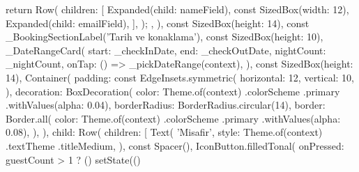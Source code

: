 \documentclass[11pt,a4paper]{article}
\begin{document}
\begin{codeblock}
{{{{{                                  return Row(
                                    children: [
                                      Expanded(child: nameField),
                                      const SizedBox(width: 12),
                                      Expanded(child: emailField),
                                    ],
                                  );
                                },
                              ),
                              const SizedBox(height: 14),
                              const _BookingSectionLabel('Tarih ve konaklama'),
                              const SizedBox(height: 10),
                              _DateRangeCard(
                                start: _checkInDate,
                                end: _checkOutDate,
                                nightCount: _nightCount,
                                onTap: () => _pickDateRange(context),
                              ),
                              const SizedBox(height: 14),
                              Container(
                                padding: const EdgeInsets.symmetric(
                                  horizontal: 12,
                                  vertical: 10,
                                ),
                                decoration: BoxDecoration(
                                  color: Theme.of(context)
                                      .colorScheme
                                      .primary
                                      .withValues(alpha: 0.04),
                                  borderRadius: BorderRadius.circular(14),
                                  border: Border.all(
                                    color: Theme.of(context)
                                        .colorScheme
                                        .primary
                                        .withValues(alpha: 0.08),
                                  ),
                                ),
                                child: Row(
                                  children: [
                                    Text(
                                      'Misafir',
                                      style: Theme.of(context)
                                          .textTheme
                                          .titleMedium,
                                    ),
                                    const Spacer(),
                                    IconButton.filledTonal(
                                      onPressed: guestCount > 1
                                          ? () {
                                              setState(() {
}}}}}}
\end{codeblock}
\end{document}
